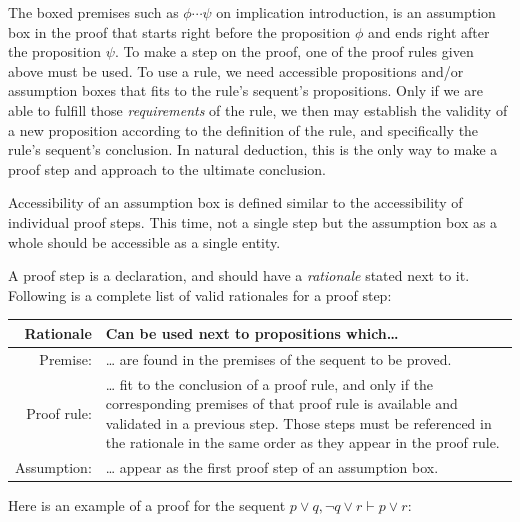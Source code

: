 \documentclass[12pt]{article}
\newcommand{\seq}{\ensuremath{\vdash}}
\begin{document}
The boxed premises such as $\boxed{\phi \dotsb \psi}$ on
implication introduction, is an assumption box in the proof
that starts right before the proposition $\phi$ and ends right
after the proposition $\psi$. 
To make a step on the proof, one of the proof rules given
above must be used. To use a rule, we need accessible propositions
and/or assumption boxes that fits to the rule's sequent's propositions.
Only if we are able to fulfill those \textit{requirements} of the rule,
we then may establish the validity of a new proposition according
to the definition of the rule, and specifically the rule's sequent's
conclusion. In natural deduction, this is the only way to
make a proof step and approach to the ultimate conclusion.

Accessibility of an assumption box is defined similar to the
accessibility of individual proof steps. This time, not a single
step but the assumption box as a whole should be accessible as a
single entity.

A proof step is a declaration, and should have a \textit{rationale}
stated next to it. Following is a complete list of valid rationales
for a proof step:
\begin{center}
	\begin{tabular}{r | p{31em}}
		\textbf{Rationale} & \textbf{Can be used next to propositions which\ldots{}}\\\hline
		Premise: & \ldots{} are found in the premises of the sequent
			to be proved.\\
		Proof rule: & \ldots{} fit to the conclusion of a proof rule,
			and only if the corresponding premises of that proof rule
			is available and validated in a previous step. Those steps
			must be referenced in the rationale in the
			same order as they appear in the proof rule.\\
		Assumption: & \ldots{} appear as the first proof step of an
			assumption box.
	\end{tabular}
\end{center}

Here is an example of a proof for the sequent
$p \lor q, \neg q \lor r \seq p \lor r$:
\end{document}
